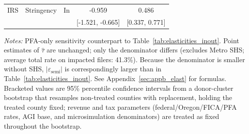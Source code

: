 \begin{table}[htbp]
\begin{threeparttable}
\begin{tabular}{lll cc}
IRS & Stringency & In & -0.959 & 0.486 \\
 & & & [-1.521, -0.665] & [0.337, 0.771] \\
\bottomrule
\end{tabular}
\begin{tablenotes}
\small
\item \textit{Notes:} 
PFA-only sensitivity counterpart to Table~\ref{tab:elasticities_inout}. 
Point estimates of $\hat{\tau}$ are unchanged; only the denominator differs (excludes Metro SHS; average total rate on impacted filers: 41.3\%). 
Because the denominator is smaller without SHS, $|\varepsilon_{\text{semi}}|$ is correspondingly larger than in Table~\ref{tab:elasticities_inout}. 
See Appendix~\ref{sec:appb_elast} for formulas. 
Bracketed values are 95\% percentile confidence intervals from a 
donor-cluster bootstrap that resamples non-treated counties with replacement, 
holding the treated county fixed; revenue and tax parameters 
(federal/Oregon/FICA/PFA rates, AGI base, and microsimulation denominators) 
are treated as fixed throughout the bootstrap.
\end{tablenotes}
\end{threeparttable}
\end{table}
